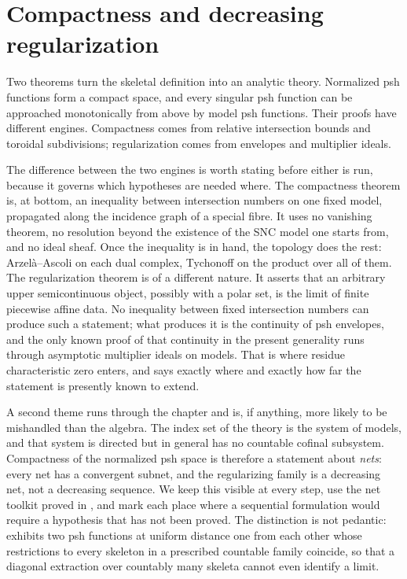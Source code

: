 \chapter{Compactness and decreasing regularization}
\label{chap:bfj-compactness}

Two theorems turn the skeletal definition into an analytic theory.
Normalized psh functions form a compact space, and every singular psh
function can be approached monotonically from above by model psh functions.
Their proofs have different engines.  Compactness comes from relative
intersection bounds and toroidal subdivisions; regularization comes from
envelopes and multiplier ideals.

The difference between the two engines is worth stating before either is
run, because it governs which hypotheses are needed where.  The compactness
theorem is, at bottom, an inequality between intersection numbers on one
fixed model, propagated along the incidence graph of a special fibre.  It
uses no vanishing theorem, no resolution beyond the existence of the SNC
model one starts from, and no ideal sheaf.  Once the inequality is in hand,
the topology does the rest: Arzel\`a--Ascoli on each dual complex, Tychonoff
on the product over all of them.  The regularization theorem is of a
different nature.  It asserts that an arbitrary upper semicontinuous
object, possibly with a polar set, is the limit of finite piecewise affine
data.  No inequality between fixed intersection numbers can produce such a
statement; what produces it is the continuity of psh envelopes, and the only
known proof of that continuity in the present generality runs through
asymptotic multiplier ideals on models.  That is where residue
characteristic zero enters, and  says exactly
where and exactly how far the statement is presently known to extend.

A second theme runs through the chapter and is, if anything, more likely to
be mishandled than the algebra.  The index set of the theory is the system
of models, and that system is directed but in general has no countable
cofinal subsystem.  Compactness of the normalized psh space is therefore a
statement about \emph{nets}: every net has a convergent subnet, and the
regularizing family is a decreasing net, not a decreasing sequence.  We keep
this visible at every step, use the net toolkit proved in
, and mark each place where a sequential
formulation would require a hypothesis that has not been proved.  The
distinction is not pedantic:  exhibits two
psh functions at uniform distance one from each other whose restrictions to
every skeleton in a prescribed countable family coincide, so that a diagonal
extraction over countably many skeleta cannot even identify a limit.

